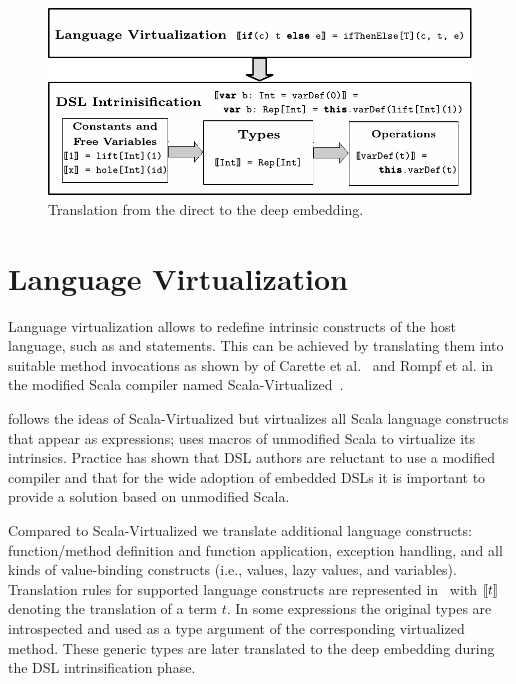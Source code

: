 \begin{figure}[!ht]
\centering
\includegraphics{diagrams/pipeline.pdf}
\caption{Translation from the direct to the deep embedding.}
\label{fig:pipeline}
\end{figure}


\section{Language Virtualization}
\label{sec:langauge-virtualization}
Language virtualization allows to redefine intrinsic constructs of the
host language, such as  and  statements. This can be
achieved by translating them into suitable method invocations as shown by of Carette et al.~\cite{carette_finally_2009} and Rompf et al. in the modified Scala compiler named Scala-Virtualized~\cite{rompf_scala-virtualized:_2009}.

 \yy follows the ideas of Scala-Virtualized but virtualizes all Scala language constructs that
  appear as expressions; uses macros of unmodified Scala to virtualize its intrinsics.
  Practice has shown that DSL authors are reluctant to use a modified compiler and that for the wide adoption
  of embedded DSLs it is important to provide a solution based on unmodified Scala.

 Compared to Scala-Virtualized we translate additional language constructs:
  function/method definition and function application, exception handling, and all kinds of value-binding constructs
  (i.e., values, lazy values, and variables). Translation rules for supported language constructs are
  represented in~ with $\llbracket t \rrbracket$ denoting the translation of a term $t$. In some expressions
  the original types are introspected and used as a type argument of the corresponding virtualized method. These
  generic types are later translated to the deep embedding during the DSL intrinsification phase.

